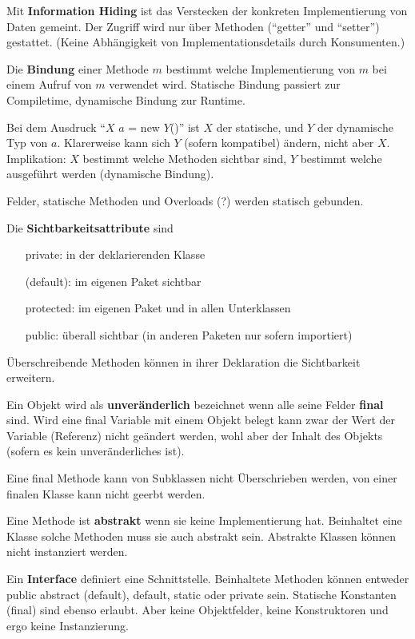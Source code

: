 \documentclass[twocolumn]{article}
\newcommand{\separator}{\vspace{0.5em}\noindent}
\newcommand{\term}[1]{\textbf{#1}}
\begin{document}
\noindent
Mit \term{Information Hiding} ist das Verstecken der konkreten Implementierung von Daten gemeint. Der Zugriff wird nur über Methoden (\enquote{getter} und \enquote{setter}) gestattet. (Keine Abhängigkeit von Implementationsdetails durch Konsumenten.)

\separator
Die \term{Bindung} einer Methode $m$ bestimmt welche Implementierung von $m$ bei einem Aufruf von $m$ verwendet wird. Statische Bindung passiert zur Compiletime, dynamische Bindung zur Runtime.

Bei dem Ausdruck \enquote{$X$ $a$ = new $Y$()} ist $X$ der statische, und $Y$ der dynamische Typ von $a$. Klarerweise kann sich $Y$ (sofern kompatibel) ändern, nicht aber $X$. Implikation: $X$ bestimmt welche Methoden sichtbar sind, $Y$ bestimmt welche ausgeführt werden (dynamische Bindung).

Felder, statische Methoden und Overloads (?) werden statisch gebunden.

\separator
Die \term{Sichtbarkeitsattribute} sind
\begin{itemize}
    \item[private:] in der deklarierenden Klasse
    \item[(default):] im eigenen Paket sichtbar
    \item[protected:] im eigenen Paket und in allen Unterklassen
    \item[public:] überall sichtbar (in anderen Paketen nur sofern importiert)
\end{itemize}
Überschreibende Methoden können in ihrer Deklaration die Sichtbarkeit erweitern.

\separator
Ein Objekt wird als \term{unveränderlich} bezeichnet wenn alle seine Felder \term{final} sind. Wird eine final Variable mit einem Objekt belegt kann zwar der Wert der Variable (Referenz) nicht geändert werden, wohl aber der Inhalt des Objekts (sofern es kein unveränderliches ist).

Eine final Methode kann von Subklassen nicht Überschrieben werden, von einer finalen Klasse kann nicht geerbt werden.

\separator
Eine Methode ist \term{abstrakt} wenn sie keine Implementierung hat. Beinhaltet eine Klasse solche Methoden muss sie auch abstrakt sein. Abstrakte Klassen können nicht instanziert werden.

\separator
Ein \term{Interface} definiert eine Schnittstelle. Beinhaltete Methoden können entweder public abstract (default), default, static oder private sein. Statische Konstanten (final) sind ebenso erlaubt. Aber keine Objektfelder, keine Konstruktoren und ergo keine Instanzierung.
\end{document}
